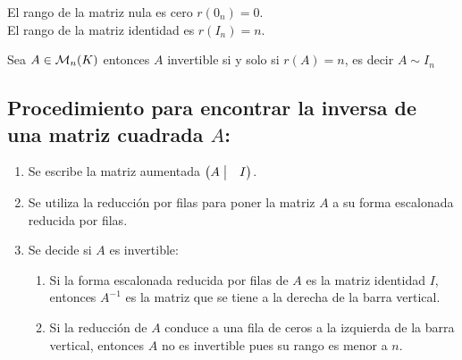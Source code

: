 \begin{rmk}
El rango de la matriz nula es cero $r(0_n) = 0$.\\
El rango de la matriz identidad es $r(I_n) = n$.
\end{rmk}

\begin{thm}
Sea $A\in  \mathcal{M}_n (K)$ entonces $A$ invertible si y solo si $r (A) = n$, es decir $A \sim I_n$
\end{thm}
\subsection{Procedimiento para encontrar la inversa de una matriz cuadrada $A$:}

\begin{enumerate}
\item
Se escribe la matriz aumentada $\begin{pmatrix}
A \bigm|& I
\end{pmatrix}$.

\item
Se utiliza la reducción por filas para poner la matriz $A$ a su forma escalonada reducida por filas.

\item
Se decide si $A$ es invertible:

\begin{enumerate}
\item
Si la forma escalonada reducida por filas de $A$ es la matriz identidad $I$, entonces $A^{-1}$ es la matriz que se tiene a la derecha de la barra vertical.

\item
Si la reducción de $A$ conduce a una fila de ceros a la izquierda de la barra vertical, entonces $A$ no es invertible pues su rango es menor a $n$.
\end{enumerate}
\end{enumerate} 

